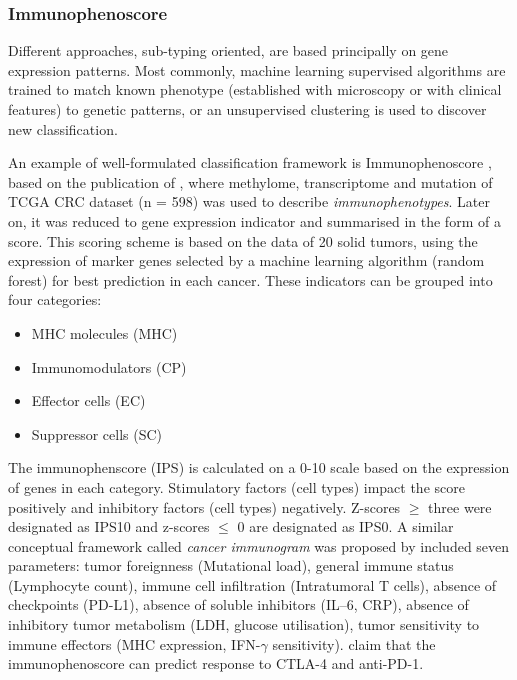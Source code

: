 \documentclass[12pt,]{book}
\providecommand{\tightlist}{%
  \setlength{\itemsep}{0pt}\setlength{\parskip}{0pt}}
\theoremstyle{definition}
\theoremstyle{definition}
\theoremstyle{definition}
\theoremstyle{remark}
\begin{document}
\hypertarget{immunophenoscore}{%
\subsubsection{Immunophenoscore}\label{immunophenoscore}}

Different approaches, sub-typing oriented, are based principally on gene
expression patterns. Most commonly, machine learning supervised
algorithms are trained to match known phenotype (established with
microscopy or with clinical features) to genetic patterns, or an
unsupervised clustering is used to discover new classification.

An example of well-formulated classification framework is
Immunophenoscore \citep{Charoentong2017}, based on the publication of
\citet{Angelova2015}, where methylome, transcriptome and mutation of
TCGA CRC dataset (n = 598) was used to describe \emph{immunophenotypes}.
Later on, it was reduced to gene expression indicator and summarised in
the form of a score. This scoring scheme is based on the data of 20
solid tumors, using the expression of marker genes selected by a machine
learning algorithm (random forest) for best prediction in each cancer.
These indicators can be grouped into four categories:

\begin{itemize}
\tightlist
\item
  MHC molecules (MHC)
\item
  Immunomodulators (CP)
\item
  Effector cells (EC)
\item
  Suppressor cells (SC)
\end{itemize}

The immunophenscore (IPS) is calculated on a 0-10 scale based on the
expression of genes in each category. Stimulatory factors (cell types)
impact the score positively and inhibitory factors (cell types)
negatively. Z-scores \(\geq\) three were designated as IPS10 and
z-scores \(\leq\) 0 are designated as IPS0. A similar conceptual
framework called \emph{cancer immunogram} was proposed by
\citet{Blank2016} included seven parameters: tumor foreignness
(Mutational load), general immune status (Lymphocyte count), immune cell
infiltration (Intratumoral T cells), absence of checkpoints (PD-L1),
absence of soluble inhibitors (IL--6, CRP), absence of inhibitory tumor
metabolism (LDH, glucose utilisation), tumor sensitivity to immune
effectors (MHC expression, IFN-\(\gamma\) sensitivity).
\citet{Charoentong2017} claim that the immunophenoscore can predict
response to CTLA-4 and anti-PD-1.
\end{document}
